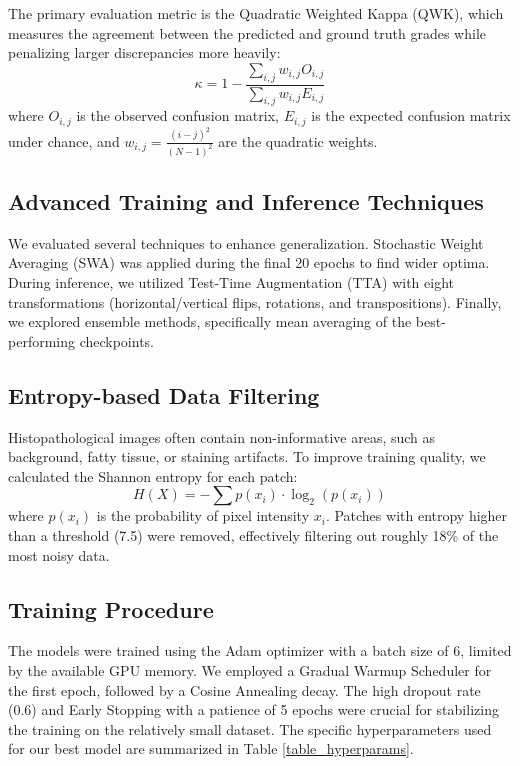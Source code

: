 \documentclass[10pt,conference]{IEEEtran}
\begin{document}
The primary evaluation metric is the Quadratic Weighted Kappa (QWK), which measures the agreement between the predicted and ground truth grades while penalizing larger discrepancies more heavily:
\begin{equation}
\kappa = 1 - \frac{\sum_{i,j} w_{i,j} O_{i,j}}{\sum_{i,j} w_{i,j} E_{i,j}}
\end{equation}
where $O_{i,j}$ is the observed confusion matrix, $E_{i,j}$ is the expected confusion matrix under chance, and $w_{i,j} = \frac{(i-j)^2}{(N-1)^2}$ are the quadratic weights.

\subsection{Advanced Training and Inference Techniques}
We evaluated several techniques to enhance generalization. Stochastic Weight Averaging (SWA) was applied during the final 20 epochs to find wider optima. During inference, we utilized Test-Time Augmentation (TTA) with eight transformations (horizontal/vertical flips, rotations, and transpositions). Finally, we explored ensemble methods, specifically mean averaging of the best-performing checkpoints.

\subsection{Entropy-based Data Filtering}
Histopathological images often contain non-informative areas, such as background, fatty tissue, or staining artifacts. To improve training quality, we calculated the Shannon entropy for each patch:
\begin{equation}
H(X) = -\sum p(x_i) \cdot \log_2(p(x_i))
\end{equation}
where $p(x_i)$ is the probability of pixel intensity $x_i$. Patches with entropy higher than a threshold (7.5) were removed, effectively filtering out roughly 18\% of the most noisy data.

\subsection{Training Procedure}
The models were trained using the Adam optimizer with a batch size of 6, limited by the available GPU memory. We employed a Gradual Warmup Scheduler for the first epoch, followed by a Cosine Annealing decay. The high dropout rate (0.6) and Early Stopping with a patience of 5 epochs were crucial for stabilizing the training on the relatively small dataset. The specific hyperparameters used for our best model are summarized in Table \ref{table_hyperparams}.
\end{document}
